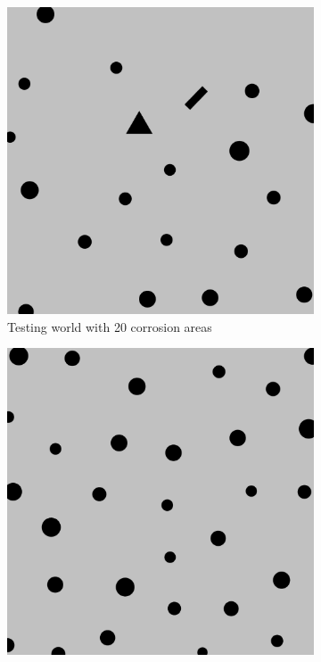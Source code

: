 \documentclass[francais,RandD]{rapportPFE}
\begin{document}
\begin{figure}[H]
\begin{subfigure}[t]{0.15\linewidth}
				\includegraphics[width=\linewidth]{graphics/test_model_20_1.png}
				\caption{Testing world with 20 corrosion areas}
				\label{fig:test_model_20_1}
			\end{subfigure}
			\hfill
			\begin{subfigure}[t]{0.15\linewidth}
				\centering
				\includegraphics[width=\linewidth]{graphics/test_model_30_1.png}

\end{subfigure}
\end{figure}
\end{document}
